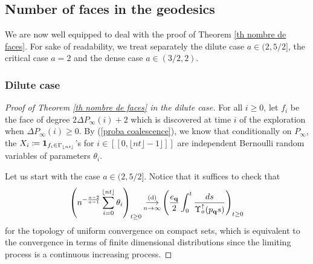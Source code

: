 \documentclass[11pt]{article}
\numberwithin{equation}{section}
\def\lb{[\![}
\def\rb{]\!]}
\begin{document}
\subsection{Number of faces in the geodesics}

We are now well equipped to deal with the proof of Theorem \ref{th nombre de faces}. For sake of readability, we treat separately the dilute case $a \in (2,5/2]$, the critical case $a=2$ and the dense case $a \in (3/2,2)$.

\subsubsection{Dilute case}
\begin{proof}[Proof of Theorem \ref{th nombre de faces} in the dilute case]
For all $i\ge 0$, let $f_i$ be the face of degree $2\Delta P_\infty(i)+2$ which is discovered at time $i$ of the exploration when $\Delta P_\infty(i)\ge 0$. By (\ref{proba coalescence}), we know that conditionally on $P_\infty$, the $X_i \coloneqq {\bf 1}_{f_i \in \Gamma_{\lfloor nt \rfloor}}$'s for $i \in \lb 0, \lfloor nt \rfloor -1 \rfloor \rb $ are independent Bernoulli random variables of parameters $\theta_i$.


Let us start with the case $a \in (2,5/2]$. Notice that it suffices to check that
	\begin{equation}\label{eq cv theta dilue}
		\left(n^{-\frac{a-2}{a-1}}\sum_{i=0}^{\lfloor nt \rfloor} \theta_i \right)_{t\ge 0}
		\mathop{\longrightarrow}\limits_{n \to \infty}^{(\mathrm{d})}
		\left(\frac{{e}_{\bf q}}{2}
		\int_0^t \frac{ds}{\Upsilon_a^\uparrow(p_{\bf q} s)}\right)_{t\ge 0}
	\end{equation}
	for the topology of uniform convergence on compact sets, which is equivalent to the convergence in terms of finite dimensional distributions since the limiting process is a continuous increasing process.
	

\end{proof}
\end{document}
